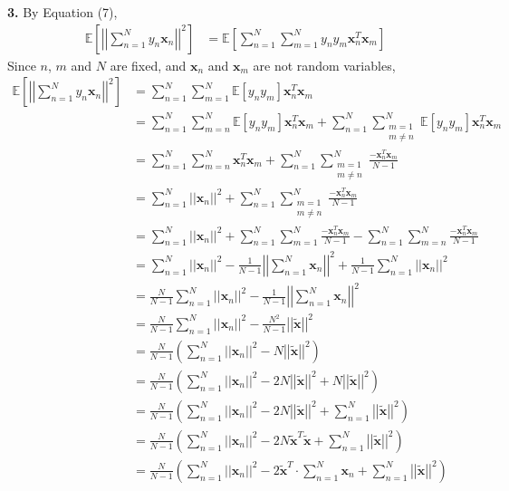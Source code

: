 \documentclass[12pt]{article}
\newcommand{\bd}[1]{\boldsymbol{#1}}
\begin{document}
\textbf{3.} By Equation (7),
\begin{align*}
    \mathbb{E}\left[\left| \left| \sum_{n=1}^N y_n\bd{x}_n\right|\right|^2\right] & = \mathbb{E}\left[\sum_{n=1}^N \sum_{m=1}^N y_n y_m\bd{x}_n^T\bd{x}_m\right]
\end{align*}
Since \(n\), \(m\) and \(N\) are fixed, and \(\bd{x}_n\) and \(\bd{x}_m\) are not random variables,
\begin{align*}
    \mathbb{E}\left[\left| \left| \sum_{n=1}^N y_n\bd{x}_n\right|\right|^2\right] & = \sum_{n=1}^N \sum_{m=1}^N \mathbb{E}\left[y_n y_m\right]\bd{x}_n^T\bd{x}_m \\
    & = \sum_{n=1}^N \sum_{m=n}^N \mathbb{E}\left[y_n y_m\right]\bd{x}_n^T\bd{x}_m + \sum_{n=1}^N \sum_{\substack{m=1\\m\neq n}}^N \mathbb{E}\left[y_n y_m\right]\bd{x}_n^T\bd{x}_m \\
    & = \sum_{n=1}^N \sum_{m=n}^N \bd{x}_n^T\bd{x}_m + \sum_{n=1}^N \sum_{\substack{m=1\\m\neq n}}^N \frac{-\bd{x}_n^T\bd{x}_m}{N-1} \\
    & = \sum_{n=1}^N  ||\bd{x}_n||^2 + \sum_{n=1}^N \sum_{\substack{m=1\\m\neq n}}^N \frac{-\bd{x}_n^T\bd{x}_m}{N-1} \\
    & = \sum_{n=1}^N  ||\bd{x}_n||^2 + \sum_{n=1}^N \sum_{m=1}^N \frac{-\bd{x}_n^T\bd{x}_m}{N-1} -  \sum_{n=1}^N \sum_{m=n}^N \frac{-\bd{x}_n^T\bd{x}_m}{N-1}\\
    & = \sum_{n=1}^N  ||\bd{x}_n||^2 - \frac{1}{N-1}\left| \left| \sum_{n=1}^N \bd{x}_n\right|\right|^2 + \frac{1}{N-1}\sum_{n=1}^N  ||\bd{x}_n||^2 \\
    & = \frac{N}{N-1}\sum_{n=1}^N  ||\bd{x}_n||^2- \frac{1}{N-1}\left| \left| \sum_{n=1}^N \bd{x}_n\right|\right|^2 \\
    & = \frac{N}{N-1}\sum_{n=1}^N  ||\bd{x}_n||^2- \frac{N^2}{N-1}\left| \left| \tilde{\bd{x}} \right|\right|^2 \\
    & = \frac{N}{N-1}\left(\sum_{n=1}^N  ||\bd{x}_n||^2 - N\left| \left| \tilde{\bd{x}} \right|\right|^2 \right)\\
    & = \frac{N}{N-1}\left(\sum_{n=1}^N  ||\bd{x}_n||^2 - 2N\left| \left| \tilde{\bd{x}} \right|\right|^2 + N\left| \left| \tilde{\bd{x}} \right|\right|^2 \right)\\
    & = \frac{N}{N-1}\left(\sum_{n=1}^N  ||\bd{x}_n||^2 - 2N\left| \left| \tilde{\bd{x}} \right|\right|^2 + \sum_{n=1}^N\left| \left| \tilde{\bd{x}} \right|\right|^2 \right)\\
    & = \frac{N}{N-1}\left(\sum_{n=1}^N  ||\bd{x}_n||^2 - 2N \tilde{\bd{x}}^T\tilde{\bd{x}} + \sum_{n=1}^N\left| \left| \tilde{\bd{x}} \right|\right|^2 \right)\\
    & = \frac{N}{N-1}\left(\sum_{n=1}^N  ||\bd{x}_n||^2 - 2 \tilde{\bd{x}}^T\cdot \sum_{n=1}^N\bd{x}_n + \sum_{n=1}^N\left| \left| \tilde{\bd{x}} \right|\right|^2 \right)\\
\end{align*}
\end{document}
